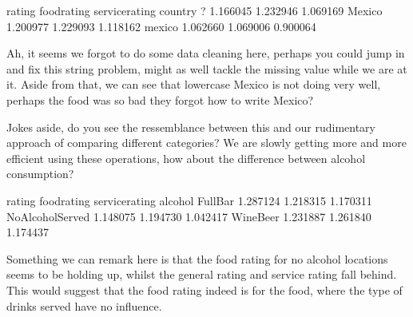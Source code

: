 \documentclass[letterpaper,10pt,english]{jupyterBook}
\begin{document}
\begin{sphinxVerbatim}[commandchars=\\\{\}]
           rating  food\PYGZus{}rating  service\PYGZus{}rating
country                                       
?        1.166045     1.232946        1.069169
Mexico   1.200977     1.229093        1.118162
mexico   1.062660     1.069006        0.900064
\end{sphinxVerbatim}

\sphinxAtStartPar
Ah, it seems we forgot to do some data cleaning here, perhaps you could jump in and fix this string problem, might as well tackle the missing value while we are at it.
Aside from that, we can see that lower\sphinxhyphen{}case Mexico is not doing very well, perhaps the food was so bad they forgot how to write Mexico?

\sphinxAtStartPar
Jokes aside, do you see the ressemblance between this and our rudimentary approach of comparing different categories?
We are slowly getting more and more efficient using these operations, how about the difference between alcohol consumption?

\begin{sphinxVerbatim}[commandchars=\\\{\}]
\PYG{p}{[}\PYG{p}{[}  \PYG{p}{]}\PYG{p}{]}
\end{sphinxVerbatim}

\begin{sphinxVerbatim}[commandchars=\\\{\}]
                     rating  food\PYGZus{}rating  service\PYGZus{}rating
alcohol                                                 
Full\PYGZus{}Bar           1.287124     1.218315        1.170311
No\PYGZus{}Alcohol\PYGZus{}Served  1.148075     1.194730        1.042417
Wine\PYGZhy{}Beer          1.231887     1.261840        1.174437
\end{sphinxVerbatim}

\sphinxAtStartPar
Something we can remark here is that the food rating for no alcohol locations seems to be holding up, whilst the general rating and service rating fall behind.
This would suggest that the food rating indeed is for the food, where the type of drinks served have no influence.
\end{document}
